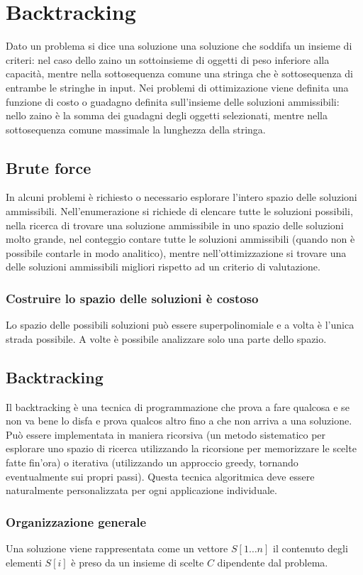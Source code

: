 \chapter{Backtracking}
Dato un problema si dice una soluzione una soluzione che soddifa un insieme di criteri: nel caso dello zaino un sottoinsieme di oggetti di peso inferiore alla capacit\`a, mentre nella
sottosequenza comune una stringa che \`e sottosequenza di entrambe le stringhe in input. Nei problemi di ottimizazione viene definita una funzione di costo o guadagno definita 
sull'insieme delle soluzioni ammissibili: nello zaino \`e la somma dei guadagni degli oggetti selezionati, mentre nella sottosequenza comune massimale la lunghezza della stringa.
\section{Brute force}
In alcuni problemi \`e richiesto o necessario esplorare l'intero spazio delle soluzioni ammissibili. Nell'enumerazione si richiede di elencare tutte le soluzioni possibili, nella ricerca
di trovare una soluzione ammissibile in uno spazio delle soluzioni molto grande, nel conteggio contare tutte le soluzioni ammissibili (quando non \`e possibile contarle in modo 
analitico), mentre nell'ottimizzazione si trovare una delle soluzioni ammissibili migliori rispetto ad un criterio di valutazione. 
\subsection{Costruire lo spazio delle soluzioni \`e costoso}
Lo spazio delle possibili soluzioni pu\`o essere superpolinomiale e a volta \`e l'unica strada possibile. A volte \`e possibile analizzare solo una parte dello spazio.
\section{Backtracking}
Il backtracking \`e una tecnica di programmazione che prova a fare qualcosa e se non va bene lo disfa e prova qualcos altro fino a che non arriva a una soluzione. Pu\`o essere 
implementata in maniera ricorsiva (un metodo sistematico per esplorare uno spazio di ricerca utilizzando la ricorsione per memorizzare le scelte fatte fin'ora) o iterativa (utilizzando
un approccio greedy, tornando eventualmente sui propri passi). Questa tecnica algoritmica deve essere naturalmente personalizzata per ogni applicazione individuale.
\subsection{Organizzazione generale}
Una soluzione viene rappresentata come un vettore $S[1\dots n]$ il contenuto degli elementi $S[i]$ \`e preso da un insieme di scelte $C$ dipendente dal problema.
